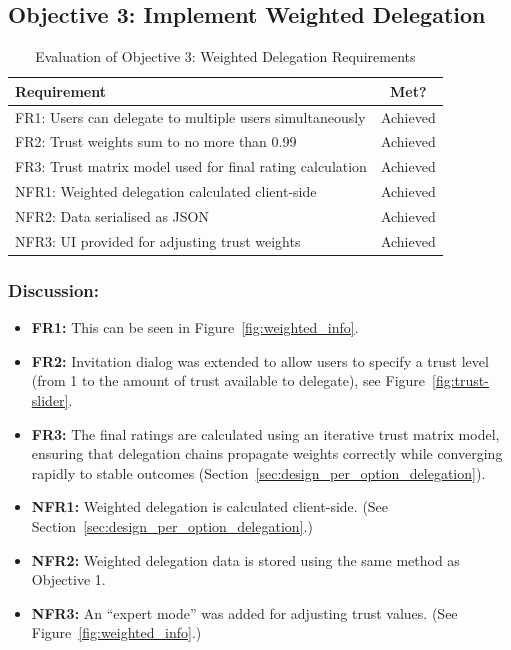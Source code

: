 \subsection{Objective 3: Implement Weighted Delegation}

\begin{table}[H]
\centering
\begin{tabular}{|p{9cm}|c|}
\hline
\textbf{Requirement} & \textbf{Met?} \\ \hline
FR1: Users can delegate to multiple users simultaneously & Achieved \\ \hline
FR2: Trust weights sum to no more than 0.99 & Achieved \\ \hline
FR3: Trust matrix model used for final rating calculation & Achieved \\ \hline
NFR1: Weighted delegation calculated client-side & Achieved \\ \hline
NFR2: Data serialised as JSON & Achieved \\ \hline
NFR3: UI provided for adjusting trust weights & Achieved \\ \hline
\end{tabular}
\caption{Evaluation of Objective 3: Weighted Delegation Requirements}
\label{tab:objective3_requirements}
\end{table}

\subsubsection{Discussion:}

\begin{itemize}
    \item \textbf{FR1:} This can be seen in Figure~\ref{fig:weighted_info}.
    \item \textbf{FR2:} Invitation dialog was extended to allow users to specify a trust level (from 1 to the amount of trust available to delegate), see Figure~\ref{fig:trust-slider}.
    \item \textbf{FR3:} The final ratings are calculated using an iterative trust matrix model, ensuring that delegation chains propagate weights correctly while converging rapidly to stable outcomes (Section~\ref{sec:design_per_option_delegation}).
    \item \textbf{NFR1:} Weighted delegation is calculated client-side. (See Section~\ref{sec:design_per_option_delegation}.)
    \item \textbf{NFR2:} Weighted delegation data is stored using the same method as Objective 1.
    \item \textbf{NFR3:} An ``expert mode'' was added for adjusting trust values. (See Figure~\ref{fig:weighted_info}.)

\end{itemize}

